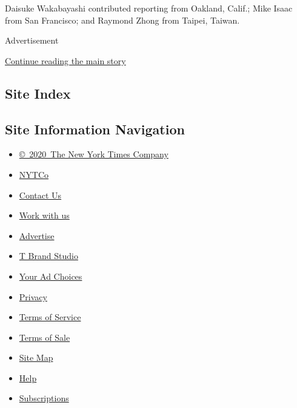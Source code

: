 Daisuke Wakabayashi contributed reporting from Oakland, Calif.; Mike
Isaac from San Francisco; and Raymond Zhong from Taipei, Taiwan.

Advertisement

\protect\hyperlink{after-bottom}{Continue reading the main story}

\hypertarget{site-index}{%
\subsection{Site Index}\label{site-index}}

\hypertarget{site-information-navigation}{%
\subsection{Site Information
Navigation}\label{site-information-navigation}}

\begin{itemize}
\tightlist
\item
  \href{https://help.nytimes.com/hc/en-us/articles/115014792127-Copyright-notice}{©~2020~The
  New York Times Company}
\end{itemize}

\begin{itemize}
\tightlist
\item
  \href{https://www.nytco.com/}{NYTCo}
\item
  \href{https://help.nytimes.com/hc/en-us/articles/115015385887-Contact-Us}{Contact
  Us}
\item
  \href{https://www.nytco.com/careers/}{Work with us}
\item
  \href{https://nytmediakit.com/}{Advertise}
\item
  \href{http://www.tbrandstudio.com/}{T Brand Studio}
\item
  \href{https://www.nytimes.com/privacy/cookie-policy\#how-do-i-manage-trackers}{Your
  Ad Choices}
\item
  \href{https://www.nytimes.com/privacy}{Privacy}
\item
  \href{https://help.nytimes.com/hc/en-us/articles/115014893428-Terms-of-service}{Terms
  of Service}
\item
  \href{https://help.nytimes.com/hc/en-us/articles/115014893968-Terms-of-sale}{Terms
  of Sale}
\item
  \href{https://spiderbites.nytimes.com}{Site Map}
\item
  \href{https://help.nytimes.com/hc/en-us}{Help}
\item
  \href{https://www.nytimes.com/subscription?campaignId=37WXW}{Subscriptions}
\end{itemize}
